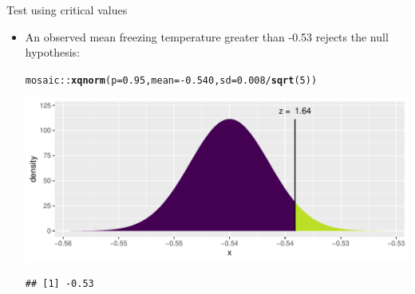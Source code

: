 \documentclass[10pt]{beamer}\usepackage[]{graphicx}\usepackage[]{color}
\makeatletter
\def\maxwidth{ %
  \ifdim\Gin@nat@width>\linewidth
    \linewidth
  \else
    \Gin@nat@width
  \fi
}
\newcommand{\hlnum}[1]{\textcolor[rgb]{0.686,0.059,0.569}{#1}}%
\newcommand{\hlopt}[1]{\textcolor[rgb]{0,0,0}{#1}}%
\newcommand{\hlstd}[1]{\textcolor[rgb]{0.345,0.345,0.345}{#1}}%
\newcommand{\hlkwc}[1]{\textcolor[rgb]{0.333,0.667,0.333}{#1}}%
\newcommand{\hlkwd}[1]{\textcolor[rgb]{0.737,0.353,0.396}{\textbf{#1}}}%
\newenvironment{kframe}{%
 \def\at@end@of@kframe{}%
 \ifinner\ifhmode%
  \def\at@end@of@kframe{\end{minipage}}%
  \begin{minipage}{\columnwidth}%
 \fi\fi%
 \def\FrameCommand##1{\hskip\@totalleftmargin \hskip-\fboxsep
 \colorbox{shadecolor}{##1}\hskip-\fboxsep
     \hskip-\linewidth \hskip-\@totalleftmargin \hskip\columnwidth}%
 \MakeFramed {\advance\hsize-\width
   \@totalleftmargin\z@ \linewidth\hsize
   \@setminipage}}%
 {\par\unskip\endMakeFramed%
 \at@end@of@kframe}
\newenvironment{knitrout}{}{} %
\makeatother
\begin{document}
\begin{frame}[fragile]{Test using critical values}
	\begin{itemize}
		
		\item An observed mean freezing temperature greater than -0.53 rejects the null hypothesis:
		
\begin{knitrout}\tiny
{}\color{fgcolor}\begin{kframe}
\begin{alltt}
\hlstd{mosaic}\hlopt{::}\hlkwd{xqnorm}\hlstd{(}\hlkwc{p} \hlstd{=} \hlnum{0.95}\hlstd{,} \hlkwc{mean} \hlstd{=} \hlopt{-}\hlnum{0.540}\hlstd{,} \hlkwc{sd} \hlstd{=} \hlnum{0.008}\hlopt{/}\hlkwd{sqrt}\hlstd{(}\hlnum{5}\hlstd{))}
\end{alltt}


{\ttfamily\noindent\itshape\color{messagecolor}{\#\# }}

{\ttfamily\noindent\itshape{}}

{\ttfamily\noindent\itshape\color{messagecolor}{\#\# 	P(X <= -0.53) = 0.95}}

{\ttfamily\noindent\itshape\color{messagecolor}{\#\# 	P(X >\ \ -0.53) = 0.05}}

{\ttfamily\noindent\itshape\color{messagecolor}{\#\# }}\end{kframe}

{\centering \includegraphics[width=\maxwidth]{figure/unnamed-chunk-3-1} 

}


\begin{kframe}\begin{verbatim}
## [1] -0.53
\end{verbatim}
\end{kframe}
\end{knitrout}
		
		
	\end{itemize}
\end{frame}
\end{document}
